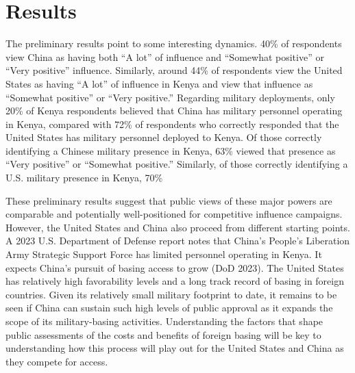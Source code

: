 \section*{Results}


The preliminary results point to some interesting dynamics. 40\% of respondents view China as having both ``A lot'' of influence and ``Somewhat positive'' or ``Very positive'' influence. Similarly, around 44\% of respondents view the United States as having ``A lot'' of influence in Kenya and view that influence as ``Somewhat positive'' or ``Very positive.'' Regarding military deployments, only 20\% of Kenya respondents believed that China has military personnel operating in Kenya, compared with 72\% of respondents who correctly responded that the United States has military personnel deployed to Kenya. Of those correctly identifying a Chinese military presence in Kenya, 63\% viewed that presence as ``Very positive'' or ``Somewhat positive.'' Similarly, of those correctly identifying a U.S. military presence in Kenya, 70\% %




These preliminary results suggest that public views of these major powers are comparable and potentially well-positioned for competitive influence campaigns. However, the United States and China also proceed from different starting points. A 2023 U.S. Department of Defense report notes that China's People's Liberation Army Strategic Support Force has limited personnel operating in Kenya. It expects China's pursuit of basing access to grow (DoD 2023). The United States has relatively high favorability levels and a long track record of basing in foreign countries. Given its relatively small military footprint to date, it remains to be seen if China can sustain such high levels of public approval as it expands the scope of its military-basing activities. Understanding the factors that shape public assessments of the costs and benefits of foreign basing will be key to understanding how this process will play out for the United States and China as they compete for access.
